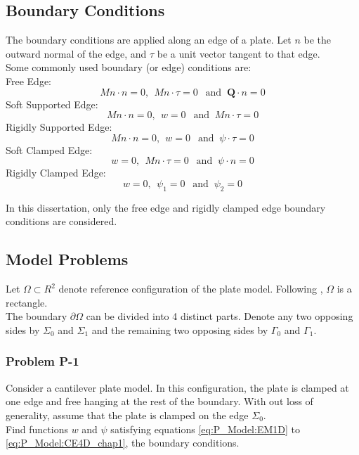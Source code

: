 \documentclass[../../main.tex]{subfiles}
\begin{document}
	\subsection{Boundary Conditions}\label{ssec:P_Model:BoundaryConditions}
	The boundary conditions are applied along an edge of a plate. Let $n$ be the outward normal of the edge, and $\tau$ be a unit vector tangent to that edge.\\
	
	Some commonly used boundary (or edge) conditions are:\\
	
	Free Edge:
	\[Mn\cdot n = 0, \ \ Mn\cdot \tau = 0 \ \ \textrm{ and }\ \mathbf{Q}\cdot n = 0 \]
	Soft Supported Edge:
	\[Mn\cdot n = 0, \ \ w = 0 \ \ \textrm{ and } \ Mn \cdot \tau = 0 \]
	Rigidly Supported Edge:
	\[Mn\cdot n = 0, \ \ w = 0 \ \ \textrm{ and } \ {\psi} \cdot \tau = 0 \]
	Soft Clamped Edge:
	\[w = 0, \ \ Mn \cdot \tau = 0 \ \ \textrm{ and } \ \psi \cdot n = 0 \]
	Rigidly Clamped Edge:
	\[w = 0, \ \ \psi_1 = 0 \ \ \textrm{ and } \ \psi_2 = 0 \]
	
	In this dissertation, only the free edge and rigidly clamped edge boundary conditions are considered.
	
	\subsection{Model Problems}\label{ssec:P_Model:ModelProblems}
	Let $\Omega \subset R^2$ denote reference configuration of the plate model. Following \cite{Wu05}, $\Omega$ is a rectangle.\\
	
	The boundary $\partial \Omega$ can be divided into 4 distinct parts. Denote any two opposing sides by $\Sigma_0$ and $\Sigma_1$ and the remaining two opposing sides by $\Gamma_0$ and $\Gamma_1$.
	
	\subsubsection{Problem P-1}\label{sssec:P_Model:ProblemP1}
	Consider a cantilever plate model. In this configuration, the plate is clamped at one edge and free hanging at the rest of the boundary. With out loss of generality, assume that the plate is clamped on the edge $\Sigma_0$.\\

	Find functions $w$ and $\psi$ satisfying equations \eqref{eq:P_Model:EM1D} to \eqref{eq:P_Model:CE4D_chap1}, the boundary conditions.\\
	
\end{document}
